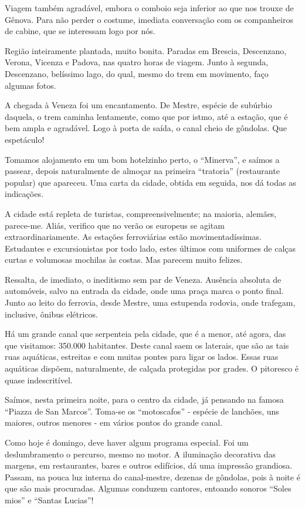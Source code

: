 Viagem também agradável, embora o comboio seja inferior ao que nos trouxe de Gênova. Para não perder o costume, imediata conversação com os companheiros de cabine, que se interessam logo por nós.

Região inteiramente plantada, muito bonita. Paradas em Brescia, Descenzano, Verona, Vicenza e Padova, nas quatro horas de viagem. Junto à segunda, Descenzano, belíssimo lago, do qual, mesmo do trem em movimento, faço algumas fotos.

A chegada à Veneza foi um encantamento. De Mestre, espécie de subúrbio daquela, o trem caminha lentamente, como que por istmo, até a estação, que é bem ampla e agradável. Logo à porta de saída, o canal cheio de gôndolas. Que espetáculo!

Tomamos alojamento em um bom hotelzinho perto, o “Minerva”, e saímos a passear, depois naturalmente de almoçar na primeira “tratoria” (restaurante popular) que apareceu. Uma carta da cidade, obtida em seguida, nos dá todas as indicações.

A cidade está repleta de turistas, compreensivelmente; na maioria, alemães, parece-me. Aliás, verifico que no verão os europeus se agitam extraordinariamente. As estações ferroviárias estão movimentadíssimas. Estudantes e excursionistas por todo lado, estes últimos com uniformes de calças curtas e volumosas mochilas às costas. Mas parecem muito felizes.

Ressalta, de imediato, o ineditismo sem par de Veneza. Ausência absoluta de automóveis, salvo na entrada da cidade, onde uma praça marca o ponto final. Junto ao leito do ferrovia, desde Mestre, uma estupenda rodovia, onde trafegam, inclusive, ônibus elétricos.

Há um grande canal que serpenteia pela cidade, que é a menor, até agora, das que visitamos: 350.000 habitantes. Deste canal saem os laterais, que são as tais ruas aquáticas, estreitas e com muitas pontes para ligar os lados. Essas ruas aquáticas dispõem, naturalmente, de calçada protegidas por grades. O pitoresco é quase indescritível.

Saímos, nesta primeira noite, para o centro da cidade, já pensando na famosa “Piazza de San Marcos”. Toma-se os “motoscafos” - espécie de lanchões, uns maiores, outros menores - em vários pontos do grande canal.

Como hoje é domingo, deve haver algum programa especial. Foi um deslumbramento o percurso, mesmo no motor. A iluminação decorativa das margens, em restaurantes, bares e outros edifícios, dá uma impressão grandiosa. Passam, na pouca luz interna do canal-mestre, dezenas de gôndolas, pois à noite é que são mais procuradas. Algumas conduzem cantores, entoando sonoros “Soles mios” e “Santas Lucias”!

